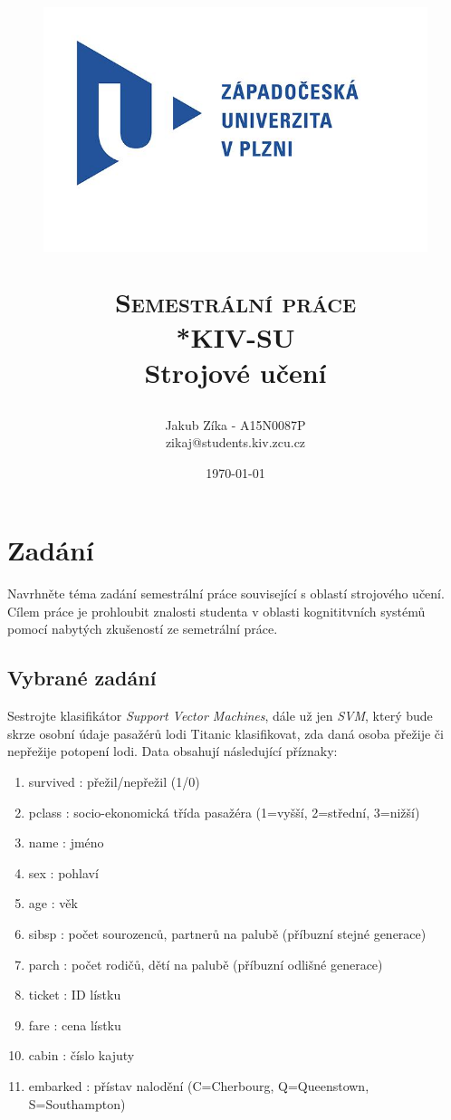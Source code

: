 \documentclass[a4]{article}
\title
{
\begin{figure}[h]
\includegraphics[scale=0.5]{zcuLogo}
\centering
\end{figure}
\textsc{\Huge{Semestrální práce}}\\*\LARGE{KIV-SU}\\\textbf{\huge{Strojové učení}}
}
\author{Jakub Zíka - A15N0087P\\zikaj@students.kiv.zcu.cz}
\date{\today}
\begin{document}
\maketitle
\newpage

\tableofcontents{}
\newpage

\section{Zadání}
Navrhněte téma zadání semestrální práce související s oblastí strojového učení. Cílem práce je prohloubit znalosti studenta v oblasti kognititvních systémů pomocí nabytých zkušeností ze semetrální práce.

\subsection{Vybrané zadání}
Sestrojte klasifikátor \textit{Support Vector Machines}, dále už jen \textit{SVM}, který bude skrze osobní údaje pasažérů lodi Titanic klasifikovat, zda daná osoba přežije či nepřežije potopení lodi. Data obsahují následující příznaky:

\begin{enumerate}
	\item survived : přežil/nepřežil (1/0)
	\item pclass : socio-ekonomická třída pasažéra (1=vyšší, 2=střední, 3=nižší)
	\item name : jméno
	\item sex : pohlaví
	\item age : věk
	\item sibsp : počet sourozenců, partnerů na palubě (příbuzní stejné generace)
	\item parch : počet rodičů, dětí na palubě (příbuzní odlišné generace)
	\item ticket : ID lístku
	\item fare : cena lístku
	\item cabin : číslo kajuty
	\item embarked : přístav nalodění (C=Cherbourg, Q=Queenstown, S=Southampton)
\end{enumerate}
\end{document}
